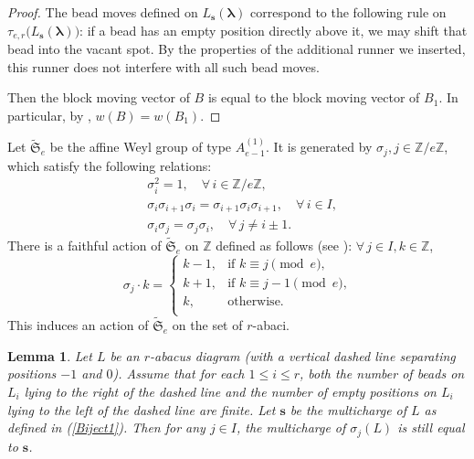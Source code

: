 \documentclass[a4paper,10pt]{amsart}
\theoremstyle{plain}
\def\bs{{\boldsymbol{s}}}
\def\Z{{\mathbb Z}}
\def\Sym{\mathfrak{S}}
\theoremstyle{plain}
\newtheorem{lemma}[theorem]{Lemma}
\numberwithin{equation}{section}
\begin{document}
\begin{proof}
The bead moves defined on \(L_{\boldsymbol{s}}(\boldsymbol{\lambda})\) correspond to the following rule on \(\tau_{e,r}\big(L_{\boldsymbol{s}}(\boldsymbol{\lambda})\big)\): if a bead has an empty position directly above it, we may shift that bead into the vacant spot. By the properties of the additional
runner we inserted, this runner does not interfere with all such bead moves.


Then the block moving vector of $B$ is equal to the block moving vector of $B_1$. In particular, by \cite[Lemma 4.1.15]{LQ2025}, $w(B)=w(B_1)$.
\end{proof}

Let $\widetilde{\Sym}_e$ be the affine Weyl group of type $A_{e-1}^{(1)}$. It is generated by $\sigma_j, j\in\Z/e\Z$,
which satisfy the following relations: $$\begin{aligned}
& \sigma_i^2=1,\quad\forall\,i\in\Z/e\Z,\\
& \sigma_i\sigma_{i+1}\sigma_i=\sigma_{i+1}\sigma_i\sigma_{i+1},\quad\forall\,i\in I,\\
& \sigma_i\sigma_j=\sigma_j\sigma_i,\quad\forall\,j\neq i\pm 1.
\end{aligned}
$$
There is a faithful action of $\widetilde{\Sym}_e$ on $\Z$ defined as follows (see \cite[\S1.2.3]{F2}): $\forall\,j\in I, k\in\Z$, $$
\sigma_j\cdot k=\begin{cases}  k-1, &\text{if $k\equiv j\pmod{e}$,}\\
 k+1, &\text{if $k\equiv j-1\pmod{e}$,}\\
 k, &\text{otherwise.}\\
\end{cases}
$$
This induces an action of $\widetilde{\Sym}_e$ on the set of $r$-abaci.

\begin{lemma}\label{3.2.1} Let $L$ be an $r$-abacus diagram (with a vertical dashed line separating positions $-1$ and $0$). Assume that for each \(1 \leq i \leq r\), both the number of beads on \(L_i\) lying to the right of the dashed line and the number of empty positions on \(L_i\) lying to the left of the dashed line are finite. Let $\bs$ be the multicharge of $L$ as defined in (\ref{Biject1}).
Then for any $j\in I$, the multicharge of $\sigma_j(L)$ is still equal to $\bs$.
\end{lemma}
\end{document}
